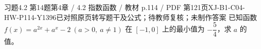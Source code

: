 \par\noindent\begin{minipage}{\linewidth}
\begin{bankitem}{习题4.2 第14题}{第4章 / 4.2 指数函数 / 教材 p.114 / PDF 第121页}{XJ-B1-C04-HW-P114-Y1396}{已对照原页转写题干及公式；待教师复核；未制作答案}
已知函数 $f(x)=a^{2x}+a^x-2\ (a>0,\ a\ne1)$ 在 $[-1,0]$ 上的最小值为 $-\dfrac54$，求 $a$ 的值。
\end{bankitem}
\end{minipage}\par\medskip
